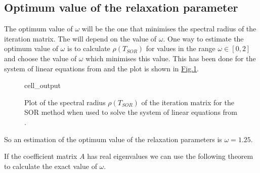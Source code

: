 \documentclass[letterpaper,10pt,english]{jupyterBook}
\begin{document}
\subsection{Optimum value of the relaxation parameter}
\label{\detokenize{7_Indirect_methods/7.4_SOR_method:optimum-value-of-the-relaxation-parameter}}\label{\detokenize{7_Indirect_methods/7.4_SOR_method:optimum-relaxation-parameter-section}}
\sphinxAtStartPar
The optimum value of \(\omega\) will be the one that minimises the spectral radius of the iteration matrix. The {\hyperref[\detokenize{7_Indirect_methods/7.4_SOR_method:sor-method-iteration-matrix-definition}]{}} will depend on the value of \(\omega\). One way to estimate the optimum value of \(\omega\) is to calculate \(\rho(T_{SOR})\) for values in the range \(\omega \in [0, 2]\) and choose the value of \(\omega\) which minimises this value. This has been done for the system of linear equations from {\hyperref[\detokenize{7_Indirect_methods/7.1_Jacobi_method:jacobi-method-example}]{}} and the plot is shown in \hyperref[\detokenize{7_Indirect_methods/7.4_SOR_method:optimum-relaxation-parameter-figure}]{Fig.\@ \ref{\detokenize{7_Indirect_methods/7.4_SOR_method:optimum-relaxation-parameter-figure}}}.

\begin{figure}[htbp]
\centering
\capstart
\begin{sphinxVerbatimOutput}

\begin{sphinxuseclass}{cell_output}
\noindent{}

\end{sphinxuseclass}\end{sphinxVerbatimOutput}
\caption{Plot of the spectral radius \(\rho(T_{SOR})\) of the iteration matrix for the SOR method when used to solve the system of linear equations from {\hyperref[\detokenize{7_Indirect_methods/7.1_Jacobi_method:jacobi-method-example}]{}}.}\label{\detokenize{7_Indirect_methods/7.4_SOR_method:optimum-relaxation-parameter-figure}}\end{figure}

\sphinxAtStartPar
So an estimation of the optimum value of the relaxation parameters is \(\omega = 1.25\).

\sphinxAtStartPar
If the coefficient matrix \(A\) has real eigenvalues we can use the following theorem to calculate the exact value of \(\omega\).
\end{document}
